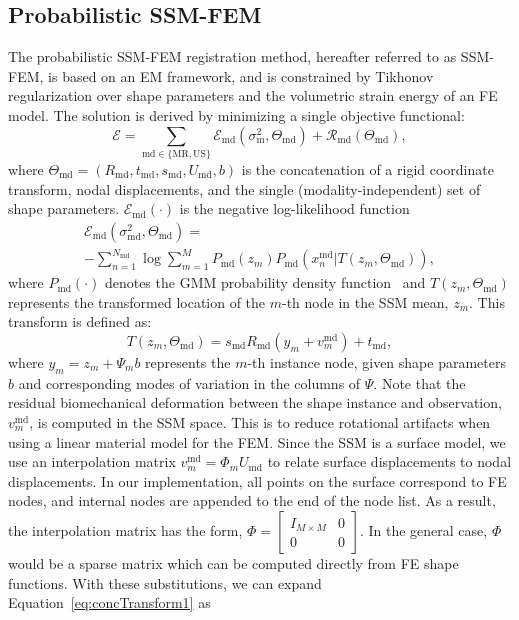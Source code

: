 \documentclass[journal]{IEEEtran}
\begin{document}
\subsection{Probabilistic SSM-FEM}
The probabilistic SSM-FEM registration method, hereafter referred to as SSM-FEM, is based on an EM framework, and is constrained by Tikhonov regularization over shape parameters and the volumetric strain energy of an FE model. The solution is derived by minimizing a single objective functional:
\begin{equation} \label{eq:objTotal1}
\mathcal{E} = \sum_{\mathrm{md}\in\{\mathrm{MR},\mathrm{US}\}}\mathcal{E}_\mathrm{md}(\sigma^2_\mathrm{m},\Theta_\mathrm{md}) + \mathcal{R}_\mathrm{md}(\Theta_\mathrm{md}),
\end{equation}
where $\Theta_\mathrm{md}=(R_\mathrm{md},t_\mathrm{md},s_\mathrm{md},U_\mathrm{md},b)$ is the concatenation of a rigid coordinate transform, nodal displacements, and the single (modality-independent) set of shape parameters. $\mathcal{E}_\mathrm{md}(\cdot)$ is the negative log-likelihood function
\begin{multline} \label{eq:objMod1}
\mathcal{E}_\mathrm{md}(\sigma^2_\mathrm{md},\Theta_\mathrm{md}) = \\ -\sum_{n=1}^{N_\mathrm{md}}\log\sum_{m=1}^MP_\mathrm{md}(z_m)P_\mathrm{md}(x^\mathrm{md}_n|T(z_m,\Theta_\mathrm{md})),
\end{multline}
where $P_\mathrm{md}(\cdot)$ denotes the GMM probability density function~\cite{Myronenko10a} and $T(z_m,\Theta_\mathrm{md})$ represents the transformed location of the $m$-th node in the SSM mean, $z_m$. This transform is defined as:
\begin{equation} \label{eq:concTransform1}
T(z_m,\Theta_\mathrm{md}) = s_\mathrm{md}R_\mathrm{md}(y_m+v^\mathrm{md}_m) + t_\mathrm{md},
\end{equation}
where $y_m=z_m+\Psi_mb$ represents the $m$-th instance node, given shape parameters $b$ and corresponding modes of variation in the columns of $\Psi$. Note that the residual biomechanical deformation between the shape instance and observation, $v^\mathrm{md}_m$, is computed in the SSM space.  This is to reduce rotational artifacts when using a linear material model for the FEM.  Since the SSM is a surface model, we use an interpolation matrix $v^\mathrm{md}_m=\Phi_mU_\mathrm{md}$ to relate surface displacements to nodal displacements. In our implementation, all points on the surface correspond to FE nodes, and internal nodes are appended to the end of the node list. As a result, the interpolation matrix has the form, $\Phi=\begin{bmatrix} I_{M\times M} & 0\\ 0 & 0 \end{bmatrix}$.  In the general case, $\Phi$ would be a sparse matrix which can be computed directly from FE shape functions.  With these substitutions, we can expand Equation~\eqref{eq:concTransform1} as
\end{document}
